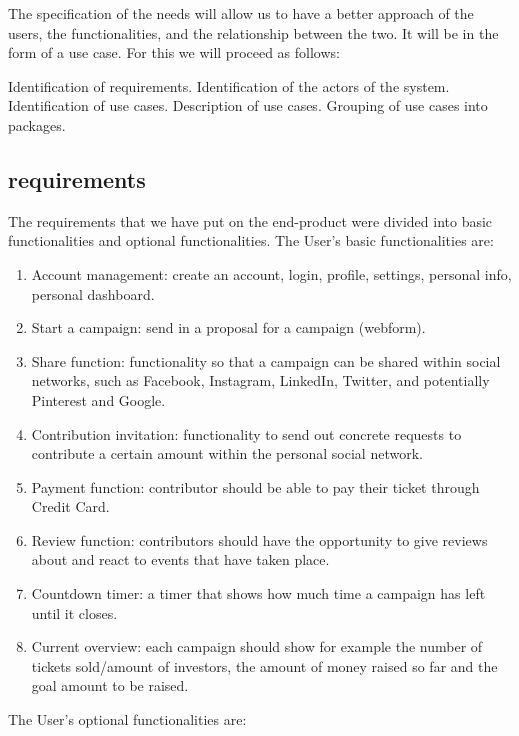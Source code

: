 The specification of the needs will allow us to have a better approach of the users, the functionalities, and the relationship between the two. It will be in the form of a use case. For this we will proceed as follows:

Identification of requirements.
Identification of the actors of the system.
Identification of use cases.
Description of use cases.
Grouping of use cases into packages.


\subsection{requirements}
The requirements that we have put on the end-product were divided into basic functionalities and optional functionalities.
The User’s basic functionalities are:
\begin{enumerate}
    \item
          Account management: create an account, login, profile, settings, personal info,
          personal dashboard.
    \item
          Start a campaign: send in a proposal for a campaign (webform).
    \item
          Share function: functionality so that a campaign can be shared within social networks, such as Facebook, Instagram, LinkedIn, Twitter, and potentially Pinterest and Google.
    \item
          Contribution invitation: functionality to send out concrete requests to contribute a certain amount
          within the personal social network.
    \item
          Payment function: contributor should be able to pay their ticket through Credit Card.
    \item
          Review function: contributors should have the opportunity to give reviews about and react to events
          that have taken place.
    \item
          Countdown timer: a timer that shows how much time a campaign has left until it closes.
    \item
          Current overview: each campaign should show for example the number of tickets sold/amount of investors, the amount of money raised so far and the goal amount to be raised.
\end{enumerate}


The User’s optional functionalities are:

